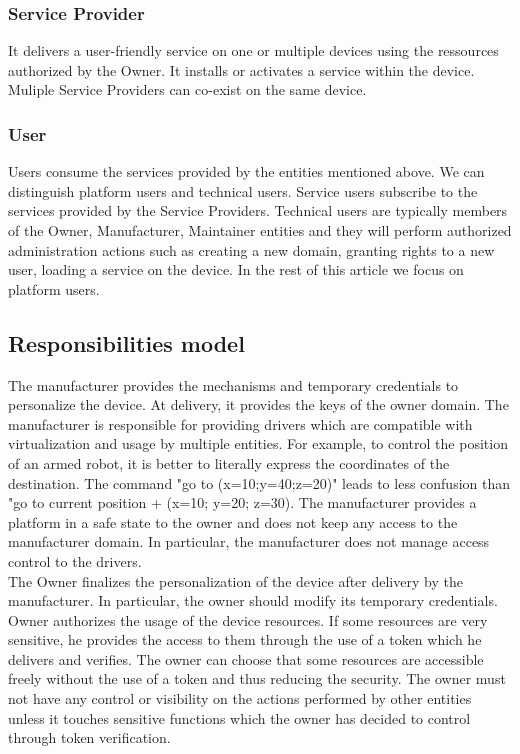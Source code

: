 \documentclass[conference]{IEEEtran}
\begin{document}
\subsubsection{Service Provider}
It delivers a user-friendly service on one or multiple devices using the ressources authorized by the Owner. It installs or activates a service within the device. Muliple Service Providers can co-exist on the same device. 
\subsubsection{User}
Users consume the services provided by the entities mentioned above. We can distinguish platform users and technical users. Service users subscribe to the services provided by the Service Providers. Technical users are typically members of the Owner, Manufacturer, Maintainer entities and they will perform authorized administration actions such as creating a new domain, granting rights to a new user, loading a service on the device. In the rest of this article we focus on platform users. 
\subsection{Responsibilities model}
\label{sec:Resp_model}

The manufacturer provides the mechanisms and temporary credentials to personalize the device. At delivery, it provides the keys of the owner domain. The manufacturer is responsible for providing drivers which are compatible with virtualization and usage by multiple entities. For example, to control the position of an armed robot, it is better to literally express the coordinates of the destination. The command "go to (x=10;y=40;z=20)" leads to less confusion than "go to current position + (x=10; y=20; z=30). The manufacturer provides a platform in a safe state to the owner and does not keep any access to the manufacturer domain. In particular, the manufacturer does not manage access control to the drivers.\\

The Owner finalizes the personalization of the device after delivery by the manufacturer. In particular, the owner should modify its temporary credentials. Owner authorizes the usage of the device resources. If some resources are very sensitive, he provides the access to them through the use of a token which he delivers and verifies. The owner can choose that some resources are accessible freely without the use of a token and thus reducing the security. The owner must not have any control or visibility on the actions performed by other entities unless it touches sensitive functions which the owner has decided to control through token verification.\\
\end{document}
